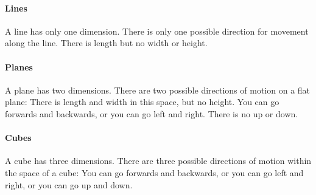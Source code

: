 \documentclass{article}
\begin{document}
\paragraph{Lines}
A line has only one dimension. There is only one possible direction for movement along the line. There is length but no width or height.

\bigskip

\begin{center}
\end{center}

\bigskip

\paragraph{Planes}
A plane has two dimensions. There are two possible directions of motion on a flat plane: There is length and width in this space, but no height. You can go forwards and backwards, or you can go left and right. There is no up or down.

\bigskip

\begin{center}
\end{center}

\newpage

\paragraph{Cubes}
A cube has three dimensions. There are three possible directions of motion within the space of a cube: You can go forwards and backwards, or you can go left and right, or you can go up and down.
\end{document}
